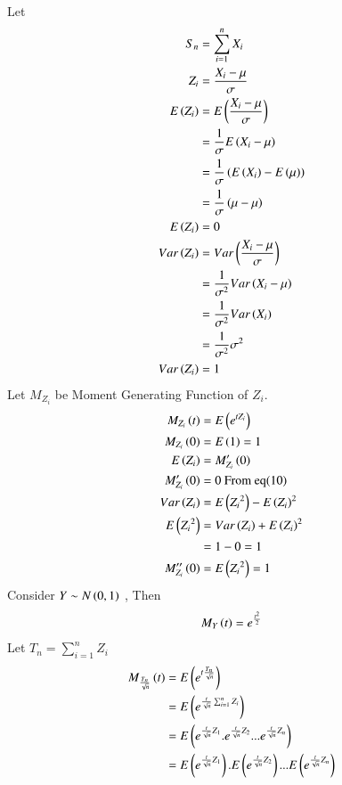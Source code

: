 \documentclass[journal,12pt,twocolumn]{IEEEtran}
\begin{document}
\begin{enumerate}[label=(\Roman*), align=left]
\\Let
\begin{align}
    S_n &= \sum_{i=1}^{n} X_i\\
    Z_i &= \frac{X_i-\mu}{\sigma}\\
    E\left(Z_i\right)&=E\left(\frac{X_i-\mu}{\sigma}\right)\\
    &= \frac{1}{\sigma}E\left(X_i - \mu\right)\nonumber\\
    &= \frac{1}{\sigma}\left(E\left(X_i\right)-E\left(\mu\right)\right)\nonumber\\
    &= \frac{1}{\sigma}\left(\mu -\mu\right)\nonumber\\
    E\left(Z_i\right)&=0\\
    Var\left(Z_i\right)&=Var\left(\frac{X_i-\mu}{\sigma}\right)\\
    &=\frac{1}{\sigma^2}Var\left(X_i-\mu\right)\nonumber\\
    &=\frac{1}{\sigma^2}Var\left(X_i\right)\nonumber\\
    &=\frac{1}{\sigma^2}\sigma^2\nonumber\\
    Var\left(Z_i\right)&=1
    \end{align}
Let $M_{Z_i}$ be Moment Generating Function of $Z_i$.
\begin{align}
      M_{Z_i}\left(t\right)&=E\left(e^{tZ_i}\right)\\
      M_{Z_i}\left(0\right)&=E\left(1\right)=1\\
      E\left(Z_i\right)&=M_{Z_i}'\left(0\right)\\
      M_{Z_i}'\left(0\right)&=0 \text{ From eq(10)}\\
      Var\left(Z_i\right)&=E\left({Z_i}^2\right)-{E\left(Z_i\right)^2}\\
      E\left({Z_i}^2\right)&=Var\left(Z_i\right)+E\left(Z_i\right)^2\nonumber\\
      &=1-0=1\nonumber\\
      M_{Z_i}''\left(0\right)&=E\left({Z_i}^2\right)=1
    \end{align}
Consider $Y \sim N\left(0,1\right)$ , Then
\begin{align}
    M_Y\left(t\right)=e^{\frac{t^2}{2}}
    \end{align}
Let $T_n=\sum_{i=1}^{n} Z_i$
\begin{align}
    M_{\frac{T_n}{\sqrt{n}}}\brak{t}&=E\brak{e^{t\frac{T_n}{\sqrt{n}}}}\\
    &=E\brak{e^{\frac{t}{\sqrt{n}}\sum_{i=1}^{n} Z_i}}\nonumber\\
    &=E\brak{e^{\frac{t}{\sqrt{n}}Z_1}.e^{\frac{t}{\sqrt{n}}Z_2}...e^{\frac{t}{\sqrt{n}} Z_n}}\nonumber\\
    &=E\brak{e^{\frac{t}{\sqrt{n}}Z_1}}.E\brak{e^{\frac{t}{\sqrt{n}}Z_2}}...E\brak{e^{\frac{t}{\sqrt{n}}Z_n}}\nonumber\\

\end{align}
\end{enumerate}
\end{document}

